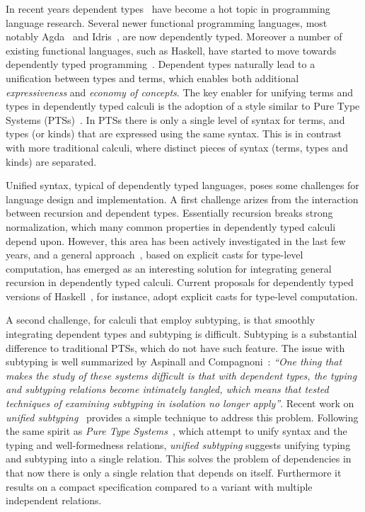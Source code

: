 In recent years dependent
types~\cite{coc,cayenne,dep:pisigma,sjoberg:msfp12,guru,fc:kind,zombie:popl14,zombie:popl15}
have become a hot topic in programming
language research. Several newer
functional programming languages, most notably Agda~\cite{2007_norell_agda} and
Idris~\cite{brady2013idris}, are now dependently typed. Moreover a number of existing functional
languages, such as Haskell, have started to move towards dependently typed programming~\cite{dependenthaskell}. Dependent types naturally lead to a unification between types and terms, which enables both
additional \emph{expressiveness} and \emph{economy of concepts}.
The key enabler for unifying terms and types in dependently typed
calculi is the adoption of a style similar to
Pure Type Systems (PTSs)~\cite{pts}. In PTSs there is only a single level
of syntax for terms, and types (or kinds) that are expressed using the
same syntax. This is in contrast with more traditional calculi, where
distinct pieces of syntax (terms, types and kinds) are separated.

Unified syntax, typical of dependently typed languages,
poses some challenges for language design and implementation.
A first challenge arizes from the interaction between recursion and dependent types.
Essentially recursion breaks strong normalization, which
many common properties in dependently typed calculi depend upon.
However, this area has been actively investigated in the
last few years, and a general approach~\cite{guru,sjoberg:msfp12, kimmel:plpv, zombie:popl15,
  isotype}, based on explicit
casts for type-level computation, has emerged as an interesting
solution for integrating general recursion in dependently typed
calculi. Current proposals for dependently typed versions of Haskell~\cite{dependenthaskell},
for instance, adopt explicit casts for type-level computation.

A second challenge, for calculi that employ subtyping, is that
smoothly integrating
dependent types and subtyping is difficult. Subtyping is a
substantial difference to traditional PTSs, which do not have such feature.
The issue with subtyping
is well summarized by Aspinall and Compagnoni~\cite{subdep}:
\emph{``One thing that makes the study of these systems difficult is that
  with
dependent types, the typing and subtyping relations become intimately
tangled, which means that tested techniques of examining subtyping in
isolation no longer apply''}.
Recent work on \emph{unified subtyping}~\cite{full} provides a
simple technique to address this problem.
Following the same spirit as \emph{Pure Type Systems}~\cite{BarendregtHP:intgts},
which attempt to unify syntax and the typing and well-formedness relations,
\emph{unified subtyping} suggests unifying typing
and subtyping into a single relation. This solves the problem of dependencies
in that now there is only a single relation that depends on itself. Furthermore
it results on a compact specification compared to a variant with multiple
independent relations.

